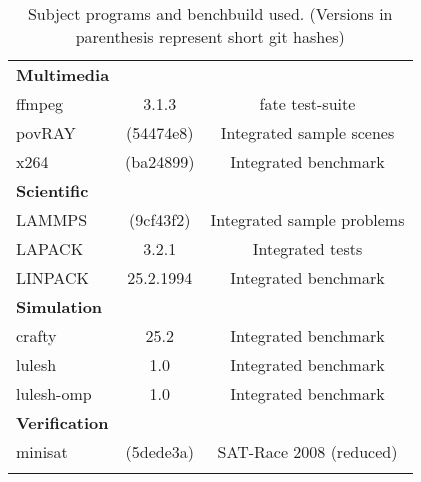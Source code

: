 \begin{longtable}{lcC}
    \midrule
    \textbf{Multimedia}\\
    ffmpeg                  & 3.1.3                 & fate test-suite\\
    povRAY                  & (54474e8)             & Integrated sample scenes\\
    x264                    & (ba24899)             & Integrated benchmark\\
    \midrule
    \textbf{Scientific}\\
    LAMMPS                  & (9cf43f2)             & Integrated sample problems\\
    LAPACK                  & 3.2.1                 & Integrated tests\\
    LINPACK                 & 25.2.1994             & Integrated benchmark\\
    \midrule
    \textbf{Simulation}\\
    crafty                  & 25.2                  & Integrated benchmark\\
    lulesh                  & 1.0                   & Integrated benchmark\\
    lulesh-omp              & 1.0                   & Integrated benchmark\\
    \midrule
    \textbf{Verification}\\
    minisat                 & (5dede3a)             & SAT-Race 2008 (reduced)\\
    \bottomrule
    \caption[Subject programs]{Subject programs and benchbuild used. (Versions in parenthesis represent short git hashes)}
    \label{tab:subjectPrograms}
\end{longtable}
